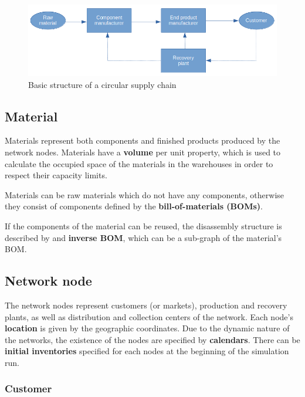 \documentclass{article}
\begin{document}
\begin{figure}[ht!]
	\center
	\includegraphics[width=\textwidth]{circular.png} 
	\caption{Basic structure of a circular supply chain}\label{fig:circular}
\end{figure}

\subsection{Material}

Materials represent both components and finished products produced by the network nodes. Materials have a \textbf{volume} per unit property, which is used to calculate the occupied space of the materials in the warehouses in order to respect their capacity limits. %

Materials can be raw materials which do not have any components, otherwise they consist of components defined by the \textbf{bill-of-materials (BOMs)}.

If the components of the material can be reused, the disassembly structure is described by and \textbf{inverse BOM}, which can be a sub-graph of the material’s BOM.

\subsection{Network node} \label{sec:node}

The network nodes represent customers (or markets), production and recovery plants, as well as distribution and collection centers of the network. Each node’s \textbf{location} is given by the geographic coordinates. Due to the dynamic nature of the networks, the existence of the nodes are specified by \textbf{calendars}. There can be \textbf{initial inventories} specified for each nodes at the beginning of the simulation run.

\subsubsection{Customer}
\end{document}
